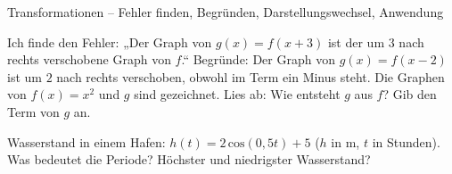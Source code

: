 \begin{aufgabe}{Transformationen – Fehler finden, Begründen, Darstellungswechsel, Anwendung}
\begin{teile}
\teil Ich finde den Fehler: „Der Graph von $g(x) = f(x + 3)$ ist der um $3$ nach rechts verschobene Graph von $f$.“
\teil Begründe: Der Graph von $g(x) = f(x - 2)$ ist um $2$ nach rechts verschoben, obwohl im Term ein Minus steht.
\teil Die Graphen von $f(x) = x^2$ und $g$ sind gezeichnet. Lies ab: Wie entsteht $g$ aus $f$? Gib den Term von $g$ an.

\begin{ksys}[xmin=-3,xmax=5,ymin=-2,ymax=5,ablesen]\end{ksys}
\teil Wasserstand in einem Hafen: $h(t) = 2\,\mathrm{cos}(0{,}5t) + 5$ ($h$ in m, $t$ in Stunden). Was bedeutet die Periode? Höchster und niedrigster Wasserstand?
\end{teile}
\end{aufgabe}
